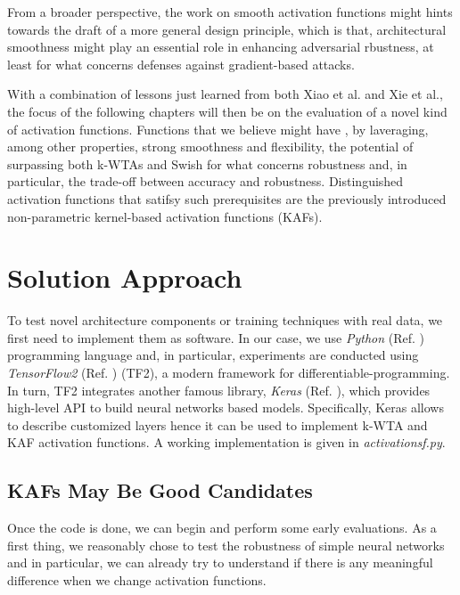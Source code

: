 \documentclass[LaM,binding=0.6cm]{./packages/sapthesis/sapthesis}
\begin{document}
    From a broader perspective, the work on smooth activation functions might
    hints towards the draft of a more general design principle, which is that,
    architectural smoothness might play an essential role in enhancing 
    adversarial rbustness, at least for what concerns defenses against 
    gradient-based attacks.

    With a combination of lessons just learned from both Xiao et al. and
    Xie et al., the focus of the following chapters will then be on the evaluation
    of a novel kind of activation functions. Functions that we believe might have 
    , by laveraging, among other properties, strong smoothness
    and flexibility, the potential of surpassing both k-WTAs and Swish 
    for what concerns robustness and, in particular, the trade-off
    between accuracy and robustness. Distinguished activation functions that 
    satifsy such prerequisites are the previously introduced non-parametric 
    kernel-based activation functions (KAFs). 



\chapter{Solution Approach}

    \label{swenv}
    To test novel architecture components or training techniques with real data, we first need to implement them as software. In our case, 
    we use \textit{Python} (Ref. ) programming language and, in particular, experiments are conducted using \textit{TensorFlow2} (Ref. ) (TF2), a modern 
    framework for differentiable-programming. In turn, TF2 integrates another famous library, \textit{Keras} (Ref. ), which provides high-level 
    API to build neural networks based models. Specifically, Keras allows to describe customized layers hence it can be used to implement k-WTA and KAF
    activation functions. A working implementation is given in \textit{activationsf.py}.

    \section{KAFs May Be Good Candidates}

        Once the code is done, we can begin and perform some early evaluations. As a first thing, we reasonably chose to test the robustness of simple neural 
        networks and in particular, we can already try to understand if there is any meaningful difference when we change activation functions.
\end{document}
